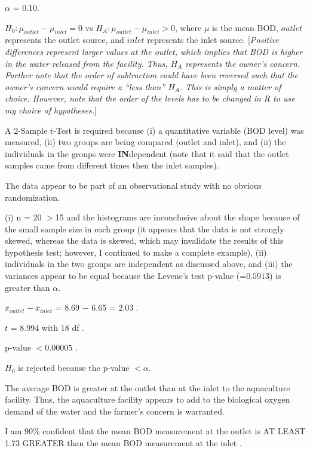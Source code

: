\documentclass[10pt,openany]{book}\usepackage[]{graphicx}\usepackage[]{color}
\begin{document}
\begin{Enumerate}
  \item $\alpha$ = 0.10.
  \item $H_{0}:\mu_{outlet}-\mu_{inlet}=0$ vs $H_{A}:\mu_{outlet}-\mu_{inlet}>0$, where $\mu$ is the mean BOD, $outlet$ represents the outlet source, and $inlet$ represents the inlet source. [\textit{Positive differences represent larger values at the outlet, which implies that BOD is higher in the water released from the facility. Thus, $H_{A}$ represents the owner's concern. Further note that the order of subtraction could have been reversed such that the owner's concern would require a ``less than'' $H_{A}$. This is simply a matter of choice. However, note that the order of the levels has to be changed in R to use my choice of hypotheses.}]
  \item A 2-Sample t-Test is required because (i) a quantitative variable (BOD level) was measured, (ii) two groups are being compared (outlet and inlet), and (ii) the individuals in the groups were \textbf{IN}dependent (note that it said that the outlet samples came from different times then the inlet samples).
  \item The data appear to be part of an observational study with no obvious randomization.
  \item (i) n = 20 $>$15 and the histograms  are inconclusive about the shape because of the small sample size in each group (it appears that the  data is not strongly skewed, whereas the  data is skewed, which may invalidate the results of this hypothesis test; however, I continued to make a complete example), (ii) individuals in the two groups are independent as discussed above, and (iii) the variances appear to be equal because the Levene's test p-value (=$0.5913$) is greater than $\alpha$.
  \item $\bar{x}_{outlet}-\bar{x}_{inlet}$ = 8.69 $-$ 6.65 = 2.03 .
  \item $t$ = 8.994 with 18 df .
  \item p-value $<0.00005$ .
  \item $H_{0}$ is rejected because the p-value $<\alpha$.
  \item The average BOD is greater at the outlet than at the inlet to the aquaculture facility. Thus, the aquaculture facility appears to add to the biological oxygen demand of the water and the farmer's concern is warranted.
  \item I am 90\% confident that the mean BOD measurement at the outlet is AT LEAST 1.73 GREATER than the mean BOD measurement at the inlet .
\end{Enumerate}
\end{document}
